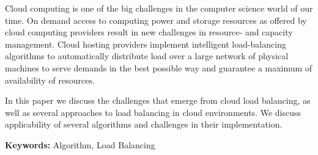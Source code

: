 Cloud computing is one of the big challenges in the computer science world of
our time.
On demand access to computing power and storage resources
as offered by cloud computing providers result in new challenges in resource-
and capacity management.
Cloud hosting providers implement intelligent load-balancing algorithms to
automatically
distribute load over a large network of physical machines to serve demands in
the best possible way and guarantee a maximum of availability of resources.

In this paper we discuss the challenges that emerge from cloud load balancing,
as well as several approaches to load balancing in cloud environments.
We discuss applicability of several algorithms and challenges in
their implementation.

\textbf{Keywords:} Algorithm, Load Balancing
